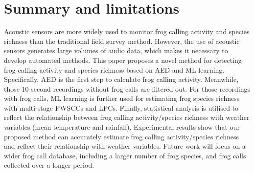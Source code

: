 \section{Summary and limitations}
Acoustic sensors are more widely used to monitor frog calling activity and species richness than the traditional field survey method. However, the use of acoustic sensors generates large volumes of audio data, which makes it necessary to develop automated methods. This paper proposes a novel method for detecting frog calling activity and species richness based on AED and ML learning. Specifically,
AED is the first step to calculate frog calling activity. Meanwhile, those 10-second recordings without frog calls are filtered out. For those recordings with frog calls, ML learning is further used for estimating frog species richness with multi-stage PWSCCs and LPCs. Finally, statistical analysis is utilised to reflect the relationship between frog calling activity/species richness with weather variables (mean temperature and rainfall). Experimental results show that our proposed method can accurately estimate frog calling activity/species richness and reflect their relationship with weather variables. Future work will focus on a wider frog call database, including a larger number of frog species, and frog calls collected over a longer period.


